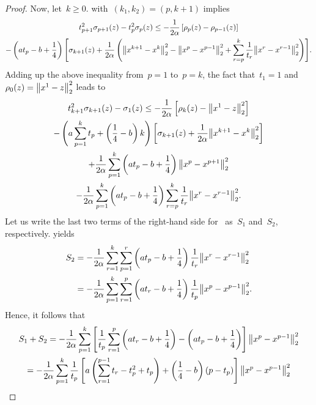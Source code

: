 \documentclass[../main]{subfiles}
\begin{document}
\begin{proof}
    Now, let~$k \ge 0$.
     with~$(k_1, k_2) = (p, k + 1)$ implies
    \begin{multline}
        t_{p + 1}^2 \sigma_{p + 1}(z) - t_p^2 \sigma_p(z) \le - \frac{1}{2 \alpha} \left[ \rho_p(z) - \rho_{p - 1}(z) \right] \\
        - \left( a t_p - b + \frac{1}{4} \right) \Biggl[ \sigma_{k + 1}(z) + \frac{1}{2 \alpha} \left( \norm*{x^{k + 1} - x^k}_2^2 - \norm*{x^p - x^{p - 1}}_2^2 + \sum_{r = p}^k \frac{1}{t_r} \norm*{x^r - x^{r - 1}}_2^2 \right) \Biggr]
    .\end{multline}
    Adding up the above inequality from~$p = 1$ to~$p = k$, the fact that~$t_1 = 1$ and~$\rho_0(z) = \norm*{x^1 - z}_2^2$ leads to
    \begin{multline} \label{eq:key relation tmp}
        t_{k + 1}^2 \sigma_{k + 1}(z) - \sigma_1(z) \le - \frac{1}{2 \alpha} \left[ \rho_{k}(z) - \norm*{x^1 - z}_2^2 \right] \\
        - \left( a \sum_{p = 1}^{k} t_p + \left( \frac{1}{4} - b \right) k \right) \left[ \sigma_{k + 1}(z) + \frac{1}{2 \alpha} \norm*{x^{k + 1} - x^k}_2^2 \right] \\
        + \frac{1}{2 \alpha} \sum_{p = 1}^{k} \left( a t_p - b + \frac{1}{4} \right) \norm*{x^p - x^{p + 1}}_2^2 \\
        - \frac{1}{2 \alpha} \sum_{p = 1}^{k} \left( a t_p - b + \frac{1}{4} \right) \sum_{r = p}^{k} \frac{1}{t_r} \norm*{x^r - x^{r - 1}}_2^2 
    .\end{multline}
    Let us write the last two terms of the right-hand side for~ as~$S_1$ and~$S_2$, respectively.
     yields
    \begin{align}
            S_2 &= - \frac{1}{2 \alpha} \sum_{r = 1}^{k} \sum_{p = 1}^{r} \left( a t_p - b + \frac{1}{4} \right) \frac{1}{t_r} \norm*{x^r - x^{r - 1}}_2^2 \\
                &= - \frac{1}{2 \alpha} \sum_{p = 1}^{k} \sum_{r = 1}^{p} \left( a t_r - b + \frac{1}{4} \right) \frac{1}{t_p} \norm*{x^p - x^{p - 1}}_2^2
    .\end{align}
    Hence, it follows that
    \begin{multline} \label{eq:s_1 + s_2}
         S_1 + S_2 = - \frac{1}{2 \alpha} \sum_{p = 1}^{k} \left[ \frac{1}{t_p} \sum_{r = 1}^{p} \left( a t_r - b + \frac{1}{4} \right) - \left( a t_p - b + \frac{1}{4} \right) \right] \norm*{x^p - x^{p - 1}}_2^2 \\
         = - \frac{1}{2 \alpha} \sum_{p = 1}^{k} \frac{1}{t_p} \left[ a \left( \sum_{r = 1}^{p - 1} t_r - t_p^2 + t_p \right) + \left( \frac{1}{4} - b \right) (p - t_p) \right] \norm*{x^p - x^{p - 1}}_2^2

\end{multline}
\end{proof}
\end{document}
